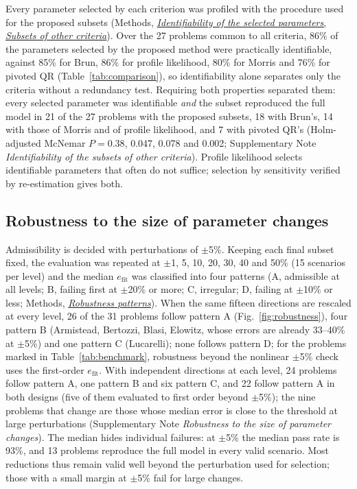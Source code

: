 \documentclass[pdflatex,sn-nature]{sn-jnl}
\theoremstyle{plain}
\newcommand{\mref}[2]{\hyperref[#1]{#2}}
\begin{document}
Every parameter selected by each criterion was profiled with the procedure used for the proposed subsets (Methods, \mref{met:identif-crit}{\emph{Identifiability of the selected parameters}, \emph{Subsets of other criteria}}). Over the 27 problems common to all criteria, 86\% of the parameters selected by the proposed method were practically identifiable, against 85\% for Brun, 86\% for profile likelihood, 80\% for Morris and 76\% for pivoted QR (Table~\ref{tab:comparison}), so identifiability alone separates only the criteria without a redundancy test. Requiring both properties separated them: every selected parameter was identifiable \emph{and} the subset reproduced the full model in 21 of the 27 problems with the proposed subsets, 18 with Brun's, 14 with those of Morris and of profile likelihood, and 7 with pivoted QR's (Holm-adjusted McNemar $P=0.38$, 0.047, 0.078 and 0.002; Supplementary Note \textit{Identifiability of the subsets of other criteria}). Profile likelihood selects identifiable parameters that often do not suffice; selection by sensitivity verified by re-estimation gives both.

\subsection*{Robustness to the size of parameter changes}\label{sec:patterns}

Admissibility is decided with perturbations of $\pm$5\%. Keeping each final subset fixed, the evaluation was repeated at $\pm$1, 5, 10, 20, 30, 40 and 50\% (15 scenarios per level) and the median $e_{\mathrm{fit}}$ was classified into four patterns (A, admissible at all levels; B, failing first at $\pm$20\% or more; C, irregular; D, failing at $\pm$10\% or less; Methods, \mref{met:robust}{\emph{Robustness patterns}}). When the same fifteen directions are rescaled at every level, 26 of the 31 problems follow pattern A (Fig.~\ref{fig:robustness}), four pattern B (Armistead, Bertozzi, Blasi, Elowitz, whose errors are already 33--40\% at $\pm$5\%) and one pattern C (Lucarelli); none follows pattern D; for the problems marked in Table~\ref{tab:benchmark}, robustness beyond the nonlinear $\pm$5\% check uses the first-order $e_{\mathrm{fit}}$. With independent directions at each level, 24 problems follow pattern A, one pattern B and six pattern C, and 22 follow pattern A in both designs (five of them evaluated to first order beyond $\pm$5\%); the nine problems that change are those whose median error is close to the threshold at large perturbations (Supplementary Note \textit{Robustness to the size of parameter changes}). The median hides individual failures: at $\pm$5\% the median pass rate is 93\%, and 13 problems reproduce the full model in every valid scenario. Most reductions thus remain valid well beyond the perturbation used for selection; those with a small margin at $\pm$5\% fail for large changes.
\end{document}
